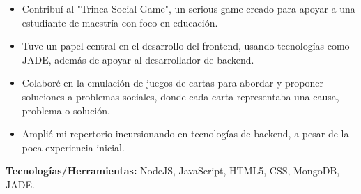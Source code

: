 \documentclass[10pt,a4paper]{altacv}
\begin{document}
\begin{itemize}
    \setlength{\itemindent}{0.5em}
    \item[--] Contribuí al "Trinca Social Game", un serious game creado para apoyar a una estudiante de maestría con foco en educación.
    \item[--] Tuve un papel central en el desarrollo del frontend, usando tecnologías como JADE, además de apoyar al desarrollador de backend.
    \item[--] Colaboré en la emulación de juegos de cartas para abordar y proponer soluciones a problemas sociales, donde cada carta representaba una causa, problema o solución.
    \item[--] Amplié mi repertorio incursionando en tecnologías de backend, a pesar de la poca experiencia inicial.
\end{itemize}
\textbf{Tecnologías/Herramientas:} NodeJS, JavaScript, HTML5, CSS, MongoDB, JADE.
\end{document}
